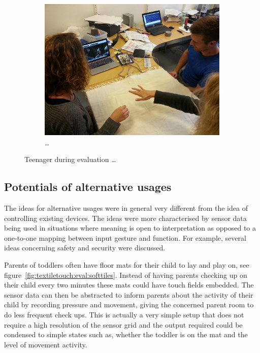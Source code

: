 \begin{figure}
        \begin{subfigure}[b]{0.9\textwidth}
                \centering
                \includegraphics[width=\textwidth]{figures/touch/evaluation/kaia-gitte-troels/kaia-gitte}
                \caption{\dots}
                \label{fig:textiletouch:eval:kaia-gitte-troels:kaia-gitte}
        \end{subfigure}
        \caption{Teenager during evaluation \dots}
        \label{fig:textiletouch:eval:kaia-gitte-troels}
\end{figure}

\subsection{Potentials of alternative usages}

The ideas for alternative usages were in general very different from the idea of controlling existing devices.
The ideas were more characterised by sensor data being used in situations where meaning is open to interpretation as opposed to a one-to-one mapping between input gesture and function.
For example, several ideas concerning safety and security were discussed.

Parents of toddlers often have floor mats for their child to lay and play on, see figure~\ref{fig:textiletouch:eval:softtiles}.
Instead of having parents checking up on their child every two minutes these mats could have touch fields embedded.
The sensor data can then be abstracted to inform parents about the activity of their child by recording pressure and movement, giving the concerned parent room to do less frequent check ups.
This is actually a very simple setup that does not require a high resolution of the sensor grid and the output required could be condensed to simple states such as, whether the toddler is on the mat and the level of movement activity.

